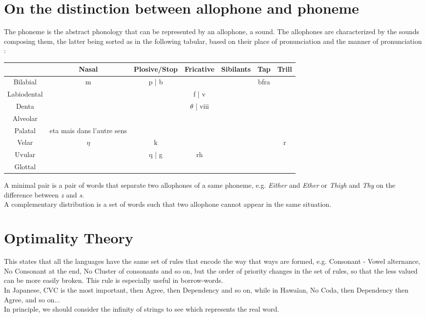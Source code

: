 \documentclass{cours}
\begin{document}
\section{On the distinction between allophone and phoneme}
The phoneme is the abstract phonology that can be represented by an allophone, a sound. The allophones are characterized by the sounds composing them, the latter being sorted as in the following tabular, based on their place of pronunciation and the manner of pronunciation : 
\begin{tabular}{ccccccc}
    \toprule
    & Nasal & Plosive/Stop & Fricative & Sibilants & Tap & Trill \\
    \midrule
    Bilabial & m & p | b & & & bfra\\   
    Labiodental & & & f | v & & & \\
    Denta & & & $\theta$ | viii & & & \\
    Alveolar & & & & & & \\
    Palatal & eta mais dans l'autre sens & & & & & \\
    Velar & $\eta$ & k & & & & r \\
    Uvular & & q | g & rh & & & \\
    Glottal & & & & & & \\
    \bottomrule
\end{tabular}

A minimal pair is a pair of words that separate two allophones of a same phoneme, e.g. \textit{Either} and \textit{Ether} or \textit{Thigh} and \textit{Thy} on the difference between \textit{z} and \textit{s}.\\
A complementary distribution is a set of words such that two allophone cannot appear in the same situation. 

\section{Optimality Theory}
This states that all the languages have the same set of rules that encode the way that ways are formed, e.g. Consonant - Vowel alternance, No Consonant at the end, No Cluster of consonants and so on, but the order of priority changes in the set of rules, so that the less valued can be more easily broken. This rule is especially useful in borrow-words. \\
In Japanese, CVC is the most important, then Agree, then Dependency and so on, while in Hawaïan, No Coda, then Dependency then Agree, and so on...\\
In principle, we should consider the infinity of strings to see which represents the real word.
\end{document}
